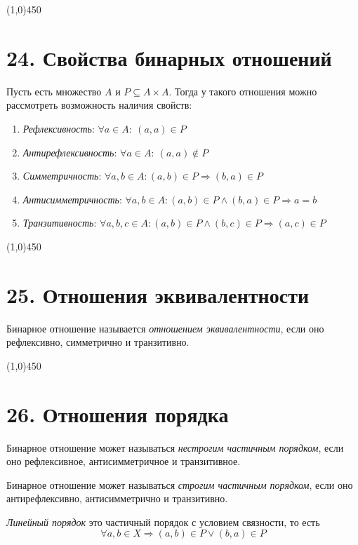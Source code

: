 \documentclass[a4paper,12pt]{article}
\begin{document}
	\begin{center}
		\line(1,0){450}
	\end{center}

	\section*{24. Свойства бинарных отношений}
	Пусть есть множество $A$ и $P \subseteq A \times A$. Тогда у такого отношения можно рассмотреть возможность наличия свойств:
	\begin{enumerate}
		\item \textit{Рефлексивность}: $\forall a \in A:\ (a, a) \in P$
		\item \textit{Антирефлексивность}: $\forall a \in A:\ (a, a) \notin P$
		\item \textit{Симметричность}: $\forall a, b \in A: (a, b) \in P \Rightarrow (b, a) \in P$
		\item \textit{Антисимметричность}: $\forall a, b \in A: (a, b) \in P \land (b, a) \in P \Rightarrow a = b$
		\item \textit{Транзитивность}: $\forall a, b, c \in A: (a, b) \in P \land (b, c) \in P \Rightarrow (a, c) \in P$
	\end{enumerate}

	\begin{center}
		\line(1,0){450}
	\end{center}

	\section*{25. Отношения эквивалентности}
	Бинарное отношение называется \textit{отношением эквивалентности}, если оно рефлексивно, симметрично и транзитивно.

	\begin{center}
		\line(1,0){450}
	\end{center}

	\section*{26. Отношения порядка}
	Бинарное отношение может называться \textit{нестрогим частичным порядком}, если оно рефлексивное, антисимметричное и транзитивное.

	Бинарное отношение может называться \textit{строгим частичным порядком}, если оно антирефлексивно, антисимметрично и транзитивно.

	\textit{Линейный порядок} это частичный порядок с условием связности, то есть
	\[
	\forall a, b \in X \Rightarrow (a, b) \in P \lor (b, a) \in P
	\]
\end{document}
